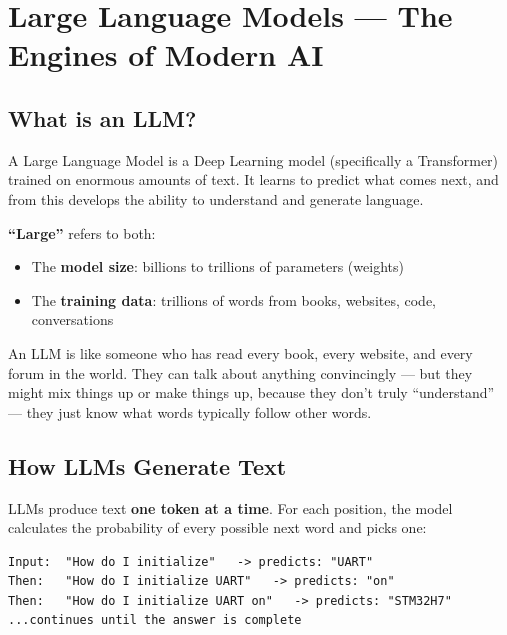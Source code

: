 \documentclass[11pt,a4paper]{report}
\begin{document}
\chapter{Large Language Models --- The Engines of Modern AI}

\section{What is an LLM?}

A Large Language Model is a Deep Learning model (specifically a Transformer) trained on enormous amounts of text. It learns to predict what comes next, and from this develops the ability to understand and generate language.

\textbf{``Large''} refers to both:
\begin{itemize}
    \item The \textbf{model size}: billions to trillions of parameters (weights)
    \item The \textbf{training data}: trillions of words from books, websites, code, conversations
\end{itemize}

\begin{analogybox}
An LLM is like someone who has read every book, every website, and every forum in the world. They can talk about anything convincingly --- but they might mix things up or make things up, because they don't truly ``understand'' --- they just know what words typically follow other words.
\end{analogybox}

\section{How LLMs Generate Text}

LLMs produce text \textbf{one token at a time}. For each position, the model calculates the probability of every possible next word and picks one:

\begin{lstlisting}
Input:  "How do I initialize"   -> predicts: "UART"
Then:   "How do I initialize UART"   -> predicts: "on"
Then:   "How do I initialize UART on"   -> predicts: "STM32H7"
...continues until the answer is complete
\end{lstlisting}
\end{document}
